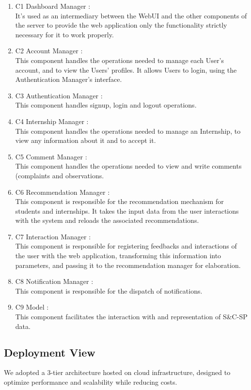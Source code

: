 \documentclass[a4paper,12pt]{article}
\begin{document}
\begin{enumerate}
    \item {C1 Dashboard Manager} :
    \\It's used as an intermediary between the WebUI and the
    other components of the server to provide the web application only the functionality
    strictly necessary for it to work properly.
    \item {C2 Account Manager} :
    \\This component handles the operations needed to manage each User's account, and to view the Users' profiles. It allows Users to login, using the Authentication Manager's interface.
    \item {C3 Authentication Manager} :
    \\This component handles signup, login and logout operations.
    \item {C4 Internship Manager} :
    \\This component handles the operations needed to manage an Internship, to view any information about it and to accept it.
    \item {C5 Comment Manager} :
    \\This component handles the operations needed to view and write comments (complaints and observations.
    \item {C6 Recommendation Manager} :
    \\This component is responsible for the recommendation mechanism for students and internships. It takes the input data from the user interactions with the system and reloads the associated recommendations.
    \item {C7 Interaction Manager} :
    \\This component is responsible for registering feedbacks and interactions of the user with the web application, transforming this information into parameters, and passing it to the recommendation manager for elaboration.
    \item {C8 Notification Manager} :
    \\This component is responsible for the dispatch of notifications.
    \item {C9 Model} :
    \\This component facilitates the interaction with and representation of S\&C-SP data.
\end{enumerate}
\subsection{Deployment View}
We adopted a 3-tier architecture hosted on cloud infrastructure, designed to optimize performance and scalability while reducing costs.
\end{document}
